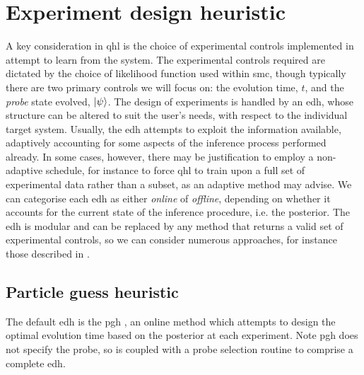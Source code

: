 \section{Experiment design heuristic}\label{sec:heuristic}
A key consideration in \gls{qhl} is the choice of experimental controls implemented in attempt to learn from the system. 
The experimental controls required are dictated by the choice of  \gls{likelihood} function used within \gls{smc}, 
    though typically there are two primary controls we will focus on: 
    the evolution time, $t$, and the \emph{\gls{probe}} state evolved, $\ket{\psi}$. 
The design of \glspl{experiment} is handled by an \gls{edh}, 
    whose structure can be altered to suit the user's needs, with respect to the individual target system. 
Usually, the \gls{edh} attempts to exploit the information available, 
    adaptively accounting for some aspects of the inference process performed already. 
In some cases, however, there may be justification to employ a non-adaptive schedule, 
    for instance to force \gls{qhl} to train upon a full set of experimental data rather than a subset,
    as an adaptive method may advise.
We can categorise each \gls{edh} as either \emph{online} of \emph{offline},
    depending on whether it accounts for the current state of the inference procedure, i.e. the posterior.
The \gls{edh} is modular and can be replaced by any method that returns a valid set of experimental controls, 
    so we can consider numerous approaches, for instance those described in \cite{hincks2018hamiltonian, fiderer2020neural}.
\par 

\subsection{Particle guess heuristic}\label{sec:pgh}
The default \gls{edh} is the \gls{pgh} \cite{Wiebe:2014qhl}, 
    an online method which attempts to design the optimal evolution time based on the posterior at each experiment.
Note \gls{pgh} does not specify the \gls{probe}, so is coupled with a \gls{probe} selection routine to comprise 
    a complete \gls{edh}.
\par

